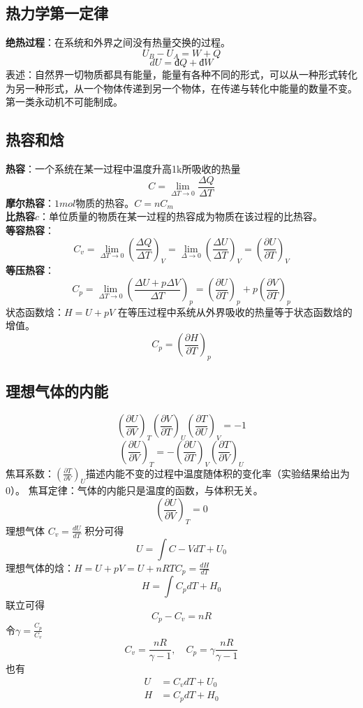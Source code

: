 \documentclass[12pt,a4paper]{article}
\begin{document}
\subsection{热力学第一定律}

\textbf{绝热过程}：在系统和外界之间没有热量交换的过程。
\[
U_B-U_A=W+Q
\]
\[
dU=\mathrm{đ}Q+\mathrm{đ}W
\]
表述：自然界一切物质都具有能量，能量有各种不同的形式，可以从一种形式转化为另一种形式，从一个物体传递到另一个物体，在传递与转化中能量的数量不变。\\
第一类永动机不可能制成。

\subsection{热容和焓}
\textbf{热容}：一个系统在某一过程中温度升高1k所吸收的热量
\[
C=\lim_{\Delta T\to0}\frac{\Delta Q}{\Delta T}
\]
\textbf{摩尔热容}：\(1mol\)物质的热容。\quad \(C=nC_m\)\\
\textbf{比热容\(c\)}：单位质量的物质在某一过程的热容成为物质在该过程的比热容。\\
\textbf{等容热容}：
\[
C_v=\lim_{\Delta T\to 0}(\frac{\Delta Q}{\Delta T})_V=\lim_{\Delta\to0}(\frac{\Delta U}{\Delta T})_V=(\frac{\partial U}{\partial T})_V
\]
\textbf{等压热容}：
\[
C_p=\lim_{\Delta T\to0}\left(\frac{\Delta U+p\Delta V}{\Delta T}\right)_p=\left(\frac{\partial U}{\partial T}\right)_p+p\left(\frac{\partial V}{\partial T}\right)_p
\]
状态函数焓：\(H=U+pV\)\quad
在等压过程中系统从外界吸收的热量等于状态函数焓的增值。
\[
C_p=\left(\frac{\partial H}{\partial T}\right)_p
\]

\subsection{理想气体的内能}
\[
\left(\frac{\partial U}{\partial V}\right)_T\left(\frac{\partial V}{\partial T}\right)_U\left(\frac{\partial T}{\partial U}\right)_V=-1
\] 
\[
\left(\frac{\partial U}{\partial V}\right)_T=-\left(\frac{\partial U}{\partial T}\right)_V\left(\frac{\partial T}{\partial V}\right)_U
\]
焦耳系数：\(\left(\frac{\partial T}{\partial V}\right)_U\)\quad 描述内能不变的过程中温度随体积的变化率（实验结果给出为0）。
焦耳定律：气体的内能只是温度的函数，与体积无关。
\[
\left(\frac{\partial U}{\partial V}\right)_T=0
\]
理想气体
\(
C_v=\frac{dU}{dT}
\)
\quad 积分可得
\[
U=\int C-VdT+U_0
\]
理想气体的焓：\(H=U+pV=U+nRT\)\quad \(C_p=\frac{dH}{dT}\)
\[
H=\int C_pdT+H_0
\]
联立可得
\[
C_p-C_v=nR
\]
令\(\gamma=\frac{C_p}{C_v}\)
\[
C_v=\frac{nR}{\gamma-1},\quad C_p=\gamma\frac{nR}{\gamma-1}
\]
也有
\[
\begin{aligned}
    U&=C_vdT+U_0\\
    H&=C_pdT+H_0
\end{aligned}
\]
\end{document}
